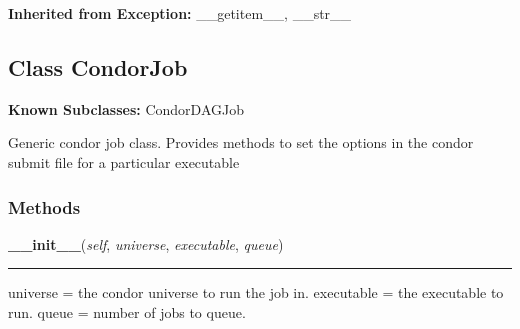   \noindent\textbf{Inherited from Exception:}
    \_\_getitem\_\_,
    \_\_str\_\_


\subsection{Class CondorJob}

    \label{pipeline:CondorJob}
\textbf{Known Subclasses:} CondorDAGJob

Generic condor job class. Provides methods to set the options in the 
condor submit file for a particular executable



  \subsubsection{Methods}

    \label{pipeline:CondorJob:__init__}
    \vspace{0.5ex}

    \noindent\begin{boxedminipage}{\textwidth}

    \raggedright \textbf{\_\_init\_\_}(\textit{self}, \textit{universe}, \textit{executable}, \textit{queue})

    \vspace{-1.5ex}

    \rule{\textwidth}{0.5\fboxrule}
    universe = the condor universe to run the job in. executable = the 
    executable to run. queue = number of jobs to queue.

    \vspace{1ex}

    \end{boxedminipage}

    \label{pipeline:CondorJob:add_arg}
    \vspace{0.5ex}

